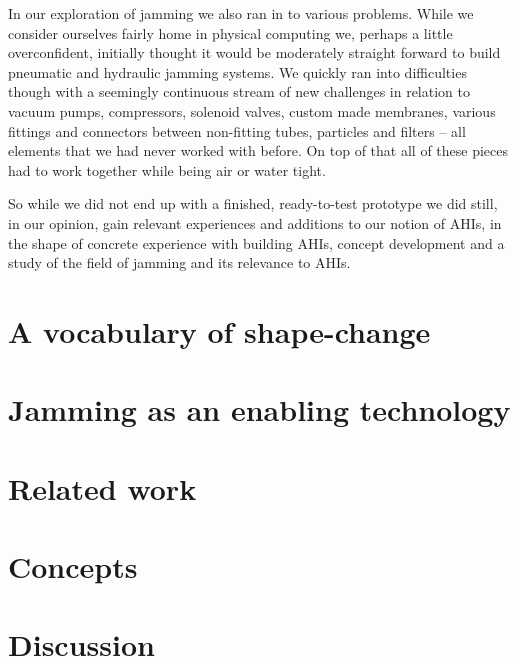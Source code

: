 In our exploration of jamming we also ran in to various problems.
While we consider ourselves fairly home in physical computing we, perhaps a little overconfident, initially thought it would be moderately straight forward to build pneumatic and hydraulic jamming systems.
We quickly ran into difficulties though with a seemingly continuous stream of new challenges in relation to vacuum pumps, compressors, solenoid valves, custom made membranes, various fittings and connectors between non-fitting tubes, particles and filters -- all elements that we had never worked with before.
On top of that all of these pieces had to work together while being air or water tight. 

So while we did not end up with a finished, ready-to-test prototype we did still, in our opinion, gain relevant experiences and additions to our notion of AHIs, in the shape of concrete experience with building AHIs, concept development and a study of the field of jamming and its relevance to AHIs. 

\section{A vocabulary of shape-change}
\label{ch:jamming:shape-change} 


\section{Jamming as an enabling technology}
\label{ch:jamming:enabling-technology} 


\section{Related work}
\label{ch:jamming:related-work} 


\section{Concepts}
\label{ch:jamming:concepts} 


\section{Discussion}
